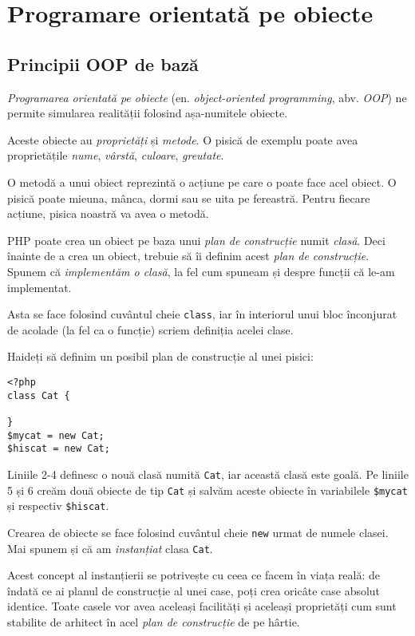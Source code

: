 \chapter{Programare orientată pe obiecte}
\section{Principii OOP de bază}
\textsl{Programarea orientată pe obiecte} (en. \textsl{object-oriented programming}, abv. \textsl{OOP})
ne permite simularea realității folosind așa-numitele obiecte.

Aceste obiecte au \textsl{proprietăți} și \textsl{metode}. O pisică de exemplu poate avea
proprietățile \textit{nume}, \textit{vârstă}, \textit{culoare}, \textit{greutate}.

O metodă a unui obiect reprezintă o acțiune pe care o poate face acel obiect. O pisică
poate mieuna, mânca, dormi sau se uita pe fereastră. Pentru fiecare acțiune,
pisica noastră va avea o metodă.

PHP poate crea un obiect pe baza unui \textit{plan de construcție} numit \textsl{clasă}.
Deci înainte de a crea un obiect, trebuie să îi definim acest \textit{plan de construcție}.
Spunem că \textit{implementăm o clasă}, la fel cum spuneam și despre funcții
că le-am implementat.

Asta se face folosind cuvântul cheie \texttt{class}, iar în interiorul unui bloc înconjurat
de acolade (la fel ca o funcție) scriem definiția acelei clase.

Haideți să definim un posibil plan de construcție al unei pisici:

\begin{lstlisting}[title=An empty class]
<?php
class Cat {

}
$mycat = new Cat;
$hiscat = new Cat;
\end{lstlisting}

Liniile 2-4 definesc o nouă clasă numită \texttt{Cat}, iar această clasă este goală.
Pe liniile 5 și 6 creăm două obiecte de tip \texttt{Cat} și salvăm aceste obiecte
în variabilele \texttt{\$mycat} și respectiv \texttt{\$hiscat}.

Crearea de obiecte se face folosind cuvântul cheie \texttt{new} urmat de numele clasei.
Mai spunem și că am \textsl{instanțiat} clasa \texttt{Cat}.

Acest concept al instanțierii se potrivește cu ceea ce facem în viața reală:
de îndată ce ai planul de construcție al unei case, poți crea oricâte case
absolut identice. Toate casele vor avea aceleași facilități și aceleași
proprietăți cum sunt stabilite de arhitect în acel \textit{plan de construcție}
de pe hârtie.

